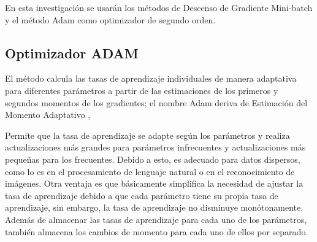 
		En esta investigación se usarán los métodos de Descenso de Gradiente Mini-batch y el método Adam como optimizador de segundo orden.

	\subsection{Optimizador ADAM}
	
		El método calcula las tasas de aprendizaje individuales de manera adaptativa para diferentes parámetros a partir de las estimaciones de los primeros y segundos momentos de los gradientes; el nombre Adam deriva de Estimación del Momento Adaptativo \citep {Adam},

		Permite que la tasa de aprendizaje se adapte según los parámetros y realiza actualizaciones más grandes para parámetros infrecuentes y actualizaciones más pequeñas para los frecuentes. Debido a esto, es adecuado para datos dispersos, como lo es en el procesamiento de lenguaje natural o en el reconocimiento de imágenes. Otra ventaja es que básicamente simplifica la necesidad de ajustar la tasa de aprendizaje debido a que cada parámetro tiene su propia tasa de aprendizaje, sin embargo, la tasa de aprendizaje no disminuye monótonamente. Además de almacenar las tasas de aprendizaje para cada uno de los parámetros, también almacena los cambios de momento para cada uno de ellos por separado.

